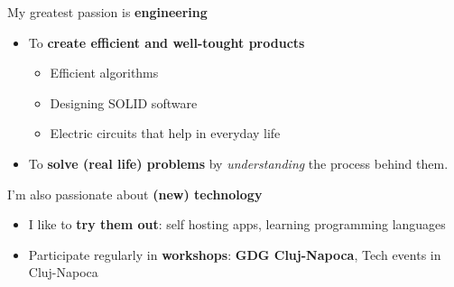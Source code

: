 
My greatest passion is \textbf{engineering} 

\begin{itemize}
\item To \textbf{create efficient and well-tought products}

\begin{itemize}
\item Efficient algorithms

\item Designing SOLID software

\item Electric circuits that help in everyday life
\end{itemize}
 
\item To \textbf{solve (real life) problems} by \textit{understanding} the process behind them.
\end{itemize}

\divider

I'm also passionate about \textbf{(new) technology}

\begin{itemize}
 \item I like to \textbf{try them out}: self hosting apps, learning programming languages
 \item Participate regularly in \textbf{workshops}: \textbf{GDG Cluj-Napoca}, Tech events in Cluj-Napoca
\end{itemize} 
